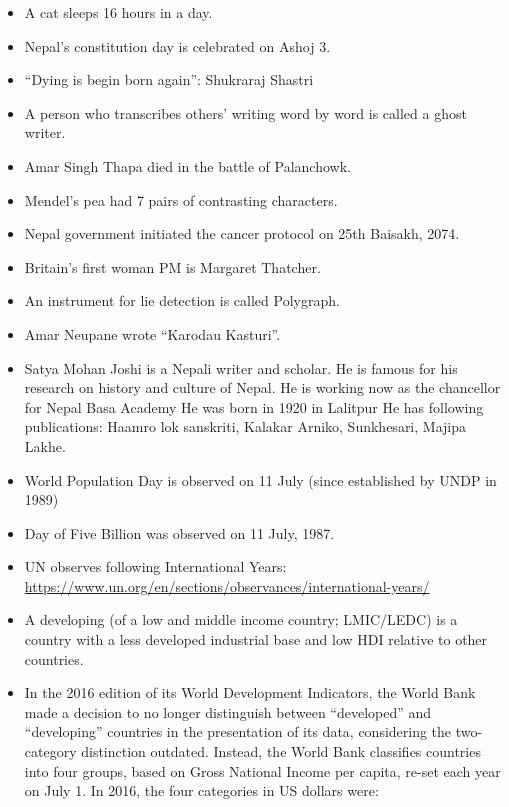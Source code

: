 \documentclass[
]{book}
\begin{document}
\begin{itemize}
\item
  A cat sleeps 16 hours in a day.
\item
  Nepal's constitution day is celebrated on Ashoj 3.
\item
  ``Dying is begin born again'': Shukraraj Shastri
\item
  A person who transcribes others' writing word by word is called a ghost writer.
\item
  Amar Singh Thapa died in the battle of Palanchowk.
\item
  Mendel's pea had 7 pairs of contrasting characters.
\item
  Nepal government initiated the cancer protocol on 25th Baisakh, 2074.
\item
  Britain's first woman PM is Margaret Thatcher.
\item
  An instrument for lie detection is called Polygraph.
\item
  Amar Neupane wrote ``Karodau Kasturi''.
\item
  Satya Mohan Joshi is a Nepali writer and scholar.
  He is famous for his research on history and culture of Nepal.
  He is working now as the chancellor for Nepal Basa Academy
  He was born in 1920 in Lalitpur
  He has following publications: Haamro lok sanskriti, Kalakar Arniko, Sunkhesari, Majipa Lakhe.
\item
  World Population Day is observed on 11 July (since established by UNDP in 1989)
\item
  Day of Five Billion was observed on 11 July, 1987.
\item
  UN observes following International Years: \url{https://www.un.org/en/sections/observances/international-years/}
\item
  A developing (of a low and middle income country; LMIC/LEDC) is a country with a less developed industrial base and low HDI relative to other countries.
\item
  In the 2016 edition of its World Development Indicators, the World Bank made a decision to no longer distinguish between ``developed'' and ``developing'' countries in the presentation of its data, considering the two-category distinction outdated. Instead, the World Bank classifies countries into four groups, based on Gross National Income per capita, re-set each year on July 1. In 2016, the four categories in US dollars were:


\end{itemize}
\end{document}
